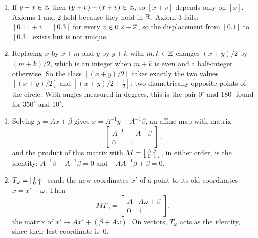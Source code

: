 \begin{enumerate}[nosep]
  \item If $y - x\in\mathbb{Z}$ then $(y + v) - (x + v)\in\mathbb{Z}$, so $[x + v]$ depends
        only on $[x]$. Axioms 1 and 2 hold because they hold in $\mathbb{R}$.
        Axiom 3 fails: $[0.1] + v = [0.3]$ for every $v\in0.2 + \mathbb{Z}$, so the
        displacement from $[0.1]$ to $[0.3]$ exists but is not unique.
  \item Replacing $x$ by $x + m$ and $y$ by $y + k$ with $m, k\in\mathbb{Z}$
        changes $(x + y)/2$ by $(m + k)/2$, which is an integer when
        $m + k$ is even and a half-integer otherwise. So the class
        $[(x + y)/2]$ takes exactly the two values $[(x + y)/2]$ and
        $[(x + y)/2 + \frac12]$: two diametrically opposite points of the
        circle. With angles measured in degrees, this is the pair
        $0^\circ$ and $180^\circ$ found for $350^\circ$ and $10^\circ$.
\end{enumerate}

\begin{enumerate}[nosep]
  \item Solving $y = Ax + \beta$ gives $x = A^{-1}y - A^{-1}\beta$, an
        affine map with matrix
        \[
          \begin{bmatrix}A^{-1} & -A^{-1}\beta\\0 & 1\end{bmatrix} ,
        \]
        and the product of this matrix with
        $M = \begin{bsmallmatrix}A & \beta\\0 & 1\end{bsmallmatrix}$, in
        either order, is the identity:
        $A^{-1}\beta - A^{-1}\beta = 0$ and
        $-AA^{-1}\beta + \beta = 0$.
  \item $T_\omega = \begin{bsmallmatrix}I & \omega\\0 & 1\end{bsmallmatrix}$
        sends the new coordinates $x'$ of a point to its old coordinates
        $x = x' + \omega$. Then
        \[
          MT_\omega
          = \begin{bmatrix}A & A\omega + \beta\\0 & 1\end{bmatrix} ,
        \]
        the matrix of $x'\mapsto Ax' + (\beta + A\omega)$. On vectors,
        $T_\omega$ acts as the identity, since their last coordinate
        is~$0$.
\end{enumerate}

